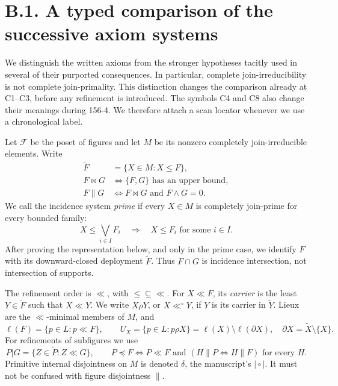 \section{B.1. A typed comparison of the successive axiom systems}
\label{SA21-B-axioms}

We distinguish the written axioms from the stronger hypotheses tacitly used
in several of their purported consequences. In particular, complete
join-irreducibility is not complete join-primality. This distinction changes
the comparison already at C1--C3, before any refinement is introduced.
The symbols C4 and C8 also change their meanings during 156-4. We therefore
attach a scan locator whenever we use a chronological label.

\begin{definition}
\label{SA21-B-notation}
Let \(\mathscr F\) be the poset of figures and let \(M\) be its nonzero
completely join-irreducible elements. Write
\[
\begin{aligned}
 \widetilde F&=\{X\in M:X\leq F\},\\
 F\bowtie G&\Longleftrightarrow\{F,G\}\text{ has an upper bound},\\
 F\parallel G&\Longleftrightarrow F\bowtie G\text{ and }F\wedge G=0.
\end{aligned}
\]
We call the incidence system \emph{prime} if every \(X\in M\) is
completely join-prime for every bounded family:
\[
 X\leq\bigvee_{i\in I}F_i\quad\Longrightarrow\quad
 X\leq F_i\text{ for some }i\in I.                 \tag{B.P}
\]
After proving the representation below, and only in the prime case, we
identify \(F\) with its downward-closed deployment \(\widetilde F\).
Thus \(F\cap G\) is incidence intersection, not intersection of supports.

The refinement order is \(\ll\), with \(\leq\subseteq\ll\).
For \(X\ll F\), its \emph{carrier} is the least \(Y\in\widetilde F\)
such that \(X\ll Y\). We write \(X\rho Y\), or \(X\ll^\circ Y\), if
\(Y\) is its carrier in \(\widetilde Y\). Lieux are the
\(\ll\)-minimal members of \(M\), and
\[
 \ell(F)=\{p\in L:p\ll F\},\qquad
 U_X=\{p\in L:p\rho X\}=\ell(X)\setminus\ell(\partial X),
 \quad \partial X=\widetilde X\setminus\{X\}.
\]
For refinements of subfigures we use
\[
 P|G=\{Z\in\widetilde P:Z\ll G\},\qquad
 P\preceq F\Longleftrightarrow P\ll F\text{ and }
 (H\parallel P\Longleftrightarrow H\parallel F)\text{ for every }H.
                                                        \tag{B.S}
\]
Primitive internal disjointness on \(M\) is denoted \(\delta\), the
manuscript's \(\mid\circ\mid\). It must not be confused with figure
disjointness \(\parallel\).
\end{definition}

